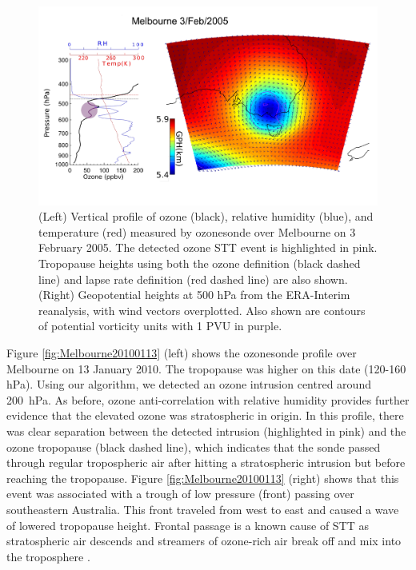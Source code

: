 \documentclass{article}
\begin{document}
    \begin{figure}[!htbp]
      \begin{center}
      \includegraphics[width=1.0\columnwidth]{figures/Melbourne20050203.png}
      \caption{(Left) Vertical profile of ozone (black), relative humidity (blue), and temperature (red) measured by ozonesonde over Melbourne on 3 February 2005.
      The detected ozone STT event is highlighted in pink.
      Tropopause heights using both the ozone definition (black dashed line) and lapse rate definition (red dashed line) are also shown.
      (Right) Geopotential heights at 500 hPa from the ERA-Interim reanalysis, with wind vectors overplotted.
      Also shown are contours of potential vorticity units with 1 PVU in purple.}
      \label{fig:Melbourne20050203}
      \end{center}
    \end{figure}
    
    Figure \ref{fig:Melbourne20100113} (left) shows the ozonesonde profile over Melbourne on 13 January 2010.
    The tropopause was higher on this date (120-160 hPa).
    Using our algorithm, we detected an ozone intrusion centred around 200~hPa.
    As before, ozone anti-correlation with relative humidity provides further evidence that the elevated ozone was stratospheric in origin.
    In this profile, there was clear separation between the detected intrusion (highlighted in pink) and the ozone tropopause (black dashed line), which indicates that the sonde passed through regular tropospheric air after hitting a stratospheric intrusion but before reaching the tropopause.
    Figure \ref{fig:Melbourne20100113} (right) shows that this event was associated with a trough of low pressure (front) passing over southeastern Australia.
    This front traveled from west to east and caused a wave of lowered tropopause height. 
    Frontal passage is a known cause of STT as stratospheric air descends and streamers of ozone-rich air break off and mix into the troposphere \citep{Sprenger2003}.
    
\end{document}
